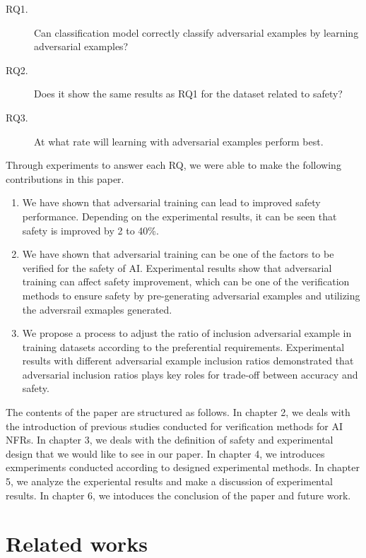 \documentclass[journal,article,submit,moreauthors,pdftex]{Definitions/mdpi}
\begin{document}
\begin{description}
    \item[RQ1.]	Can classification model correctly classify adversarial examples by learning adversarial examples?
    \item[RQ2.]	Does it show the same results as RQ1 for the dataset related to safety?
    \item[RQ3.]	At what rate will learning with adversarial examples perform best.
\end{description}

Through experiments to answer each RQ, we were able to make the following contributions in this paper.

\begin{enumerate}
    \item	We have shown that adversarial training can lead to improved safety performance. Depending on the experimental results, it can be seen that safety is improved by 2 to 40\%.
    \item	We have shown that adversarial training can be one of the factors to be verified for the safety of AI. Experimental results show that adversarial training can affect safety improvement, which can be one of the verification methods to ensure safety by pre-generating adversarial examples and utilizing the adversrail exmaples generated.
    \item	We propose a process to adjust the ratio of inclusion adversarial example in training datasets according to the preferential requirements. Experimental results with different adversarial example inclusion ratios demonstrated that adversarial inclusion ratios plays key roles for trade-off between accuracy and safety.
\end{enumerate} 

The contents of the paper are structured as follows. In chapter 2, we deals with the introduction of previous studies conducted for verification methods for AI NFRs.
In chapter 3, we deals with the definition of safety and experimental design that we would like to see in our paper.
In chapter 4, we introduces exmperiments conducted according to designed experimental methods.
In chapter 5, we analyze the experiental results and make a discussion of experimental results.
In chapter 6, we intoduces the conclusion of the paper and future work.

\section{Related works}
\end{document}
